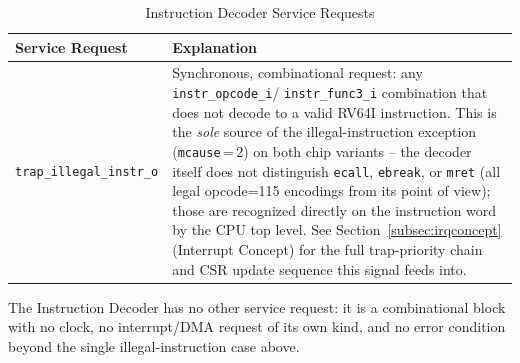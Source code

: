 \begin{table}[H]
\caption{Instruction Decoder Service Requests}
\label{tab:asDecServiceReq}
\centering
\begin{tabularx}{\textwidth}{|l |X|}
  \hline
  Service Request & Explanation \\
  \hline
  \hline
  \texttt{trap\_illegal\_instr\_o} &
    Synchronous, combinational request: any \texttt{instr\_opcode\_i}/
    \texttt{instr\_func3\_i} combination that does not decode to a valid
    RV64I instruction. This is the \emph{sole} source of the
    illegal-instruction exception (\texttt{mcause}\,=\,2) on both chip
    variants -- the decoder itself does not distinguish \texttt{ecall},
    \texttt{ebreak}, or \texttt{mret} (all legal opcode=115 encodings from
    its point of view); those are recognized directly on the instruction
    word by the CPU top level. See Section~\ref{subsec:irqconcept}
    (Interrupt Concept) for the full trap-priority chain and CSR update
    sequence this signal feeds into. \\
  \hline
\end{tabularx}
\end{table}

The Instruction Decoder has no other service request: it is a
combinational block with no clock, no interrupt/DMA request of its own
kind, and no error condition beyond the single illegal-instruction case
above.
